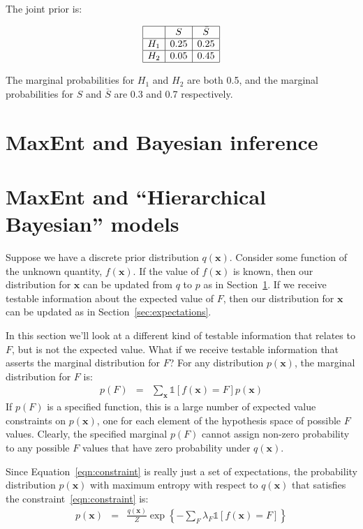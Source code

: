 \documentclass[letterpaper, 11pt]{article}
\newcommand{\xx}{\boldsymbol{x}}
\begin{document}
The joint prior is:

\begin{eqnarray}
\begin{array}{|c|c|c|}
\hline
	&	S	& \bar{S}\\
\hline
H_1 & 0.25  & 0.25\\
\hline
H_2 & 0.05 & 0.45\\
\hline
\end{array}
\end{eqnarray}

The marginal probabilities for $H_1$ and $H_2$ are both 0.5, and the
marginal probabilities for $S$ and $\bar{S}$ are 0.3 and 0.7 respectively.


\section{MaxEnt and Bayesian inference}\label{sec:bayes}

\section{MaxEnt and ``Hierarchical Bayesian'' models}
Suppose we have a discrete prior distribution $q(\xx)$. Consider some
function of the unknown quantity, $f(\xx)$.
If the value of $f(\xx)$ is known, then our distribution for $\xx$ can
be updated from $q$ to $p$ as in Section~\ref{sec:bayes}.
If we receive testable information
about the expected value of $F$, then our distribution for $\xx$ can
be updated as in Section~\ref{sec:expectations}.

In this section we'll look at a different kind of testable information that
relates to $F$, but is not the expected value. What if we receive testable
information that asserts the marginal distribution for $F$?
For any distribution $p(\xx)$, the marginal distribution for $F$ is:
\begin{eqnarray}
p(F) &=& \sum_{\xx}\mathds{1}\left[f(\xx) = F\right]p(\xx)\label{eqn:constraint}
\end{eqnarray}
If $p(F)$ is a specified function, this is a large number of expected
value constraints on $p(\xx)$, one for each element of the hypothesis space
of possible $F$ values. Clearly, the specified marginal $p(F)$ cannot assign
non-zero probability to any possible $F$ values that have zero probability
under $q(\xx)$.

Since Equation~\ref{eqn:constraint} is really just a set of expectations,
the probability distribution
$p(\xx)$ with maximum entropy with respect to $q(\xx)$ that satisfies the
constraint~\ref{eqn:constraint} is:
\begin{eqnarray}
p(\xx) &=& \frac{q(\xx)}{Z}\exp\left\{-\sum_F \lambda_F \mathds{1}
\left[f(\xx) = F\right]  \right\}
\end{eqnarray}
\end{document}
